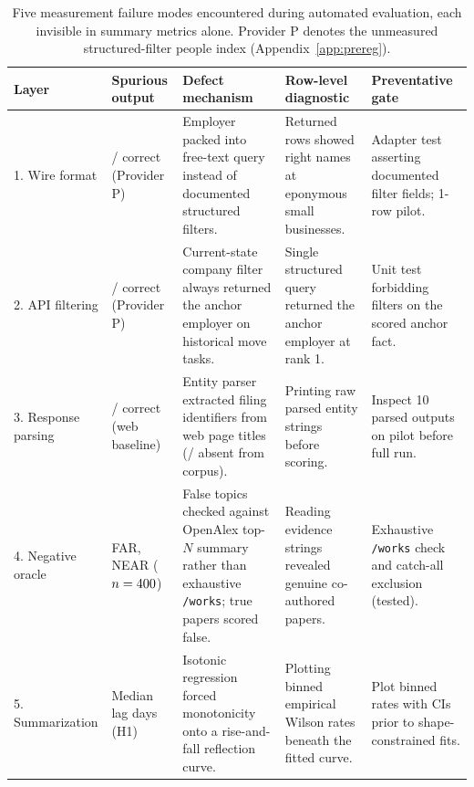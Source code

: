 \documentclass[11pt]{article}
\begin{document}
\begin{table}[!tb]
\centering\footnotesize
\begin{tabularx}{\linewidth}{@{}l>{\raggedright\arraybackslash}p{2.3cm}>{\raggedright\arraybackslash}p{2.2cm}>{\raggedright\arraybackslash}X>{\raggedright\arraybackslash}p{2.6cm}@{}}
\toprule
Layer & Spurious output & Defect mechanism & Row-level diagnostic & Preventative gate \\
\midrule
1. Wire format & \tiPRunOneCorrect{}/\tiPRunOneN{} correct (Provider P) & Employer packed into free-text query instead of documented structured filters. & Returned rows showed right names at eponymous small businesses. & Adapter test asserting documented filter fields; 1-row pilot. \\
2. API filtering & \tiPRunTwoCorrect{}/\tiPRunTwoN{} correct (Provider P) & Current-state company filter always returned the anchor employer on historical move tasks. & Single structured query returned the anchor employer at rank 1. & Unit test forbidding filters on the scored anchor fact. \\
3. Response parsing & \tiWebCorrect{}/\tiWebN{} correct (web baseline) & Entity parser extracted filing identifiers from web page titles (\tiWebNotInCorpus{}/\tiWebN{} absent from corpus). & Printing raw parsed entity strings before scoring. & Inspect 10 parsed outputs on pilot before full run. \\
4. Negative oracle & \tiRawFar{} FAR, \tiRawNear{} NEAR ($n=400{}$) & False topics checked against OpenAlex top-$N$ summary rather than exhaustive \texttt{/works}; true papers scored false. & Reading evidence strings revealed genuine co-authored papers. & Exhaustive \texttt{/works} check and catch-all exclusion (tested). \\
5. Summarization & Median lag \tiHoneIsoLag{} days (H1) & Isotonic regression forced monotonicity onto a rise-and-fall reflection curve. & Plotting binned empirical Wilson rates beneath the fitted curve. & Plot binned rates with CIs prior to shape-constrained fits. \\
\bottomrule
\end{tabularx}
\caption{Five measurement failure modes encountered during automated evaluation, each invisible in summary metrics alone. Provider P denotes the unmeasured structured-filter people index (Appendix~\ref{app:prereg}).}
\label{tab:defects}
\end{table}
\end{document}
